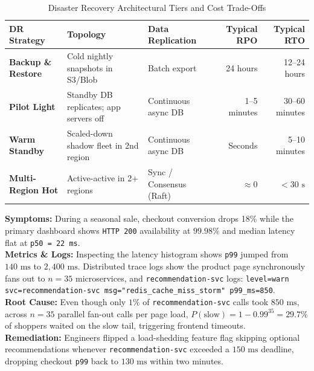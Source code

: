 \begin{table}[htbp]
\centering\small
\begin{tabular}{lllrr}
\toprule
\textbf{DR Strategy} & \textbf{Topology} & \textbf{Data Replication} & \textbf{Typical RPO} & \textbf{Typical RTO} \\
\midrule
\textbf{Backup \& Restore} & Cold nightly snapshots in S3/Blob & Batch export & 24 hours & 12--24 hours \\
\textbf{Pilot Light} & Standby DB replicates; app servers off & Continuous async DB & 1--5 minutes & 30--60 minutes \\
\textbf{Warm Standby} & Scaled-down shadow fleet in 2nd region & Continuous async DB & Seconds & 5--10 minutes \\
\textbf{Multi-Region Hot} & Active-active in 2+ regions & Sync / Consensus (Raft) & $\approx 0$ & $< 30\text{ s}$ \\
\bottomrule
\end{tabular}
\caption{Disaster Recovery Architectural Tiers and Cost Trade-Offs}
\label{tab:v5-ch01-dr-tiers}
\end{table}

\begin{realworldbox}
\textbf{Symptoms:} During a seasonal sale, checkout conversion drops 18\% while the primary dashboard shows \texttt{HTTP 200} availability at $99.98\%$ and median latency flat at \texttt{p50 = 22 ms}.\\
\textbf{Metrics \& Logs:} Inspecting the latency histogram shows \texttt{p99} jumped from $140\text{ ms}$ to $2,400\text{ ms}$. Distributed trace logs show the product page synchronously fans out to $n = 35$ microservices, and \texttt{recommendation-svc} logs:
\texttt{level=warn svc=recommendation-svc msg="redis\_cache\_miss\_storm" p99\_ms=850}.\\
\textbf{Root Cause:} Even though only $1\%$ of \texttt{recommendation-svc} calls took $850\text{ ms}$, across $n = 35$ parallel fan-out calls per page load, $P(\text{slow}) = 1 - 0.99^{35} = 29.7\%$ of shoppers waited on the slow tail, triggering frontend timeouts.\\
\textbf{Remediation:} Engineers flipped a load-shedding feature flag skipping optional recommendations whenever \texttt{recommendation-svc} exceeded a $150\text{ ms}$ deadline, dropping checkout \texttt{p99} back to $130\text{ ms}$ within two minutes.
\end{realworldbox}

